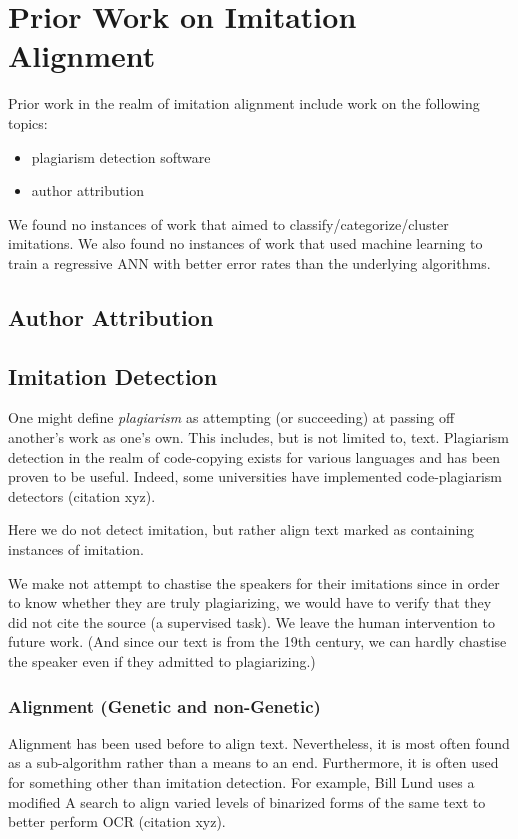 \section {Prior Work on Imitation Alignment}
Prior work in the realm of imitation alignment include work on the following topics:
	\begin{itemize}
		\item plagiarism detection software
		\item author attribution
	\end{itemize}

We found no instances of work that aimed to classify/categorize/cluster imitations. We also found no instances of work that used machine learning to train a regressive ANN with better error rates than the underlying algorithms.

\subsection{Author Attribution}

\subsection{Imitation Detection}
One might define \textit{plagiarism} as attempting (or succeeding) at passing off another's work as one's own. This includes, but is not limited to, text. Plagiarism detection in the realm of code-copying exists for various languages and has been proven to be useful. Indeed, some universities have implemented code-plagiarism detectors (citation xyz).

Here we do not detect imitation, but rather align text marked as containing instances of imitation. 

We make not attempt to chastise the speakers for their imitations since in order to know whether they are truly plagiarizing, we would have to verify that they did not cite the source (a supervised task). We leave the human intervention to future work. (And since our text is from the 19th century, we can hardly chastise the speaker even if they admitted to plagiarizing.)

\subsubsection{Alignment (Genetic and non-Genetic)}
Alignment has been used before to align text. Nevertheless, it is most often found as a sub-algorithm rather than a means to an end. Furthermore, it is often used for something other than imitation detection. For example, Bill Lund uses a modified A\* search to align varied levels of binarized forms of the same text to better perform OCR (citation xyz).

